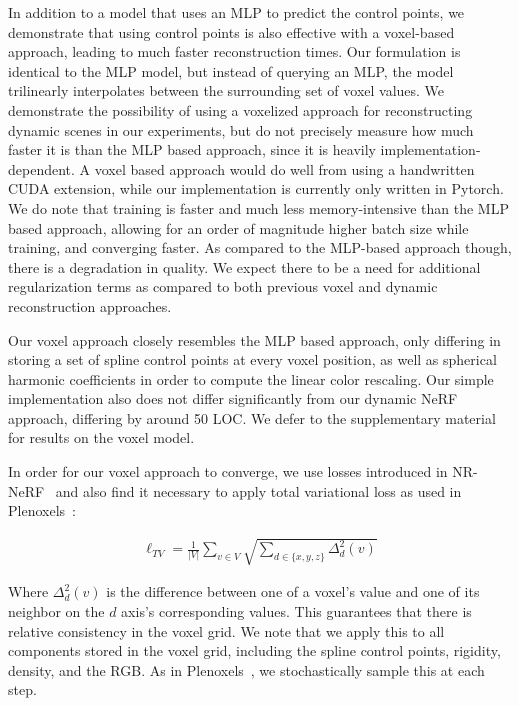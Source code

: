 In addition to a model that uses an MLP to predict the control points, we demonstrate that using control points is also effective with a voxel-based approach, leading to much faster reconstruction times. Our formulation is identical to the MLP model, but instead of querying an MLP, the model trilinearly interpolates between the surrounding set of voxel values. We demonstrate the possibility of using a voxelized approach for reconstructing dynamic scenes in our experiments, but do not precisely measure how much faster it is than the MLP based approach, since it is heavily implementation-dependent. A voxel based approach would do well from using a handwritten CUDA extension, while our implementation is currently only written in Pytorch. We do note that training is faster and much less memory-intensive than the MLP based approach, allowing for an order of magnitude higher batch size while training, and converging faster. As compared to the MLP-based approach though, there is a degradation in quality. We expect there to be a need for additional regularization terms as compared to both previous voxel and dynamic reconstruction approaches.

Our voxel approach closely resembles the MLP based approach, only differing in storing a set of spline control points at every voxel position, as well as spherical harmonic coefficients in order to compute the linear color rescaling. Our simple implementation also does not differ significantly from our dynamic NeRF approach, differing by around 50 LOC. We defer to the supplementary material for results on the voxel model.

In order for our voxel approach to converge, we use losses introduced in NR-NeRF~\cite{tretschk2021nonrigid} and also find it necessary to apply total variational loss as used in Plenoxels~\cite{yu2021plenoxels}:

\begin{align}
    \ell_{TV} = \frac{1}{|V|} \sum_{v\in V} \sqrt{\sum_{d\in \{x,y,z\}} \Delta^2_d(v)}
\end{align}

Where $\Delta^2_d(v)$ is the difference between one of a voxel's value and one of its neighbor on the $d$ axis's corresponding values. This guarantees that there is relative consistency in the voxel grid. We note that we apply this to all components stored in the voxel grid, including the spline control points, rigidity, density, and the RGB. As in Plenoxels~\cite{yu2021plenoxels}, we stochastically sample this at each step.
